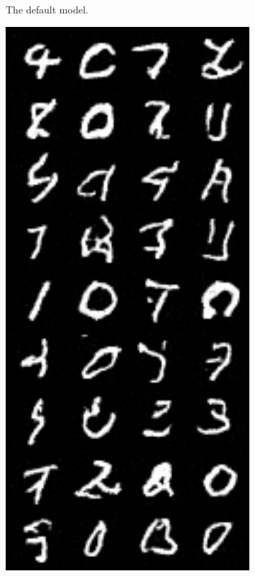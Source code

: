 \begin{figure}
\begin{subfigure}{0.3\textwidth}
    \caption{The default model.}
    \label{fig:q1b_samples_def_final}
\end{subfigure}%
\hfill
\begin{subfigure}{0.3\textwidth}
    \centering
    \includegraphics[width=1\textwidth]{./figures/q1b_samples_short_final}

\end{subfigure}
\end{figure}
